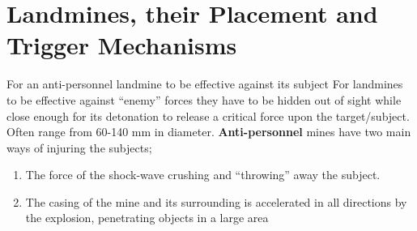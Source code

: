 \section{Landmines, their Placement and Trigger Mechanisms}

For an anti-personnel landmine to be effective against its subject  
For landmines to be effective against “enemy” forces they have to be hidden out of sight while close enough for its detonation to release a critical force upon the target/subject. Often range from 60-140 mm in diameter. \textbf{Anti-personnel} mines have two main ways of injuring the subjects;
\begin{enumerate}
    \item The force of the shock-wave crushing and “throwing” away the subject.
    \item The casing of the mine and its surrounding is accelerated in all directions by the explosion, penetrating objects in a large area
\end{enumerate}

